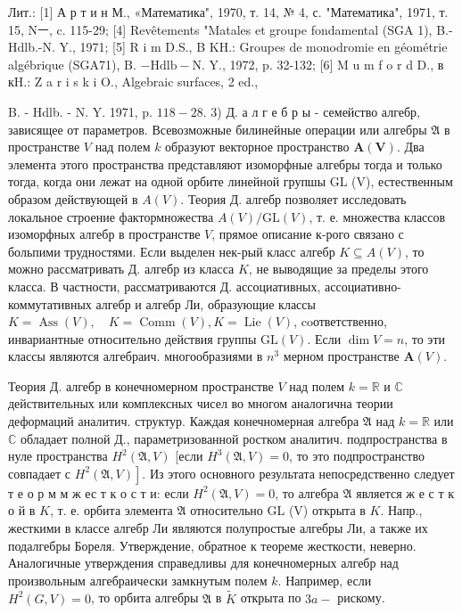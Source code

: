 \documentclass[10pt]{article}
\begin{document}
Лит.: [1] А р т и н М., «Математика", 1970, т. 14, № 4, с. "Математика", 1971, т. 15, Nㅡ, c. 115-29; [4] Revêtements "Matales et groupe fondamental (SGA 1), B.- Hdlb.-N. Y., 1971; [5] R i m D.S., B KH.: Groupes de monodromie en géométrie algébrique (SGA71), B. $-\mathrm{Hdlb}-\mathrm{N}$. Y., 1972, p. 32-132; [6] M u m f o r d D., в кH.: Z a r i s k i O., Algebraic surfaces, 2 ed.,

B. - Hdlb. - N. Y. 1971, p. $118-28$. 3) Д. а л г е б р ы - семейство алгебр, зависящее от параметров. Всевозможные билинейные операции или алгебры $\mathfrak{A}$ в пространстве $V$ над полем $k$ образуют векторное пространство $\boldsymbol{A}(\boldsymbol{V})$. Два элемента этого пространства представляют изоморфные алгебры тогда и только тогда, когда они лежат на одной орбите линейной групшы GL (V), естественным образом действующей в $A(V)$. Теория Д. алгебр позволяет исследовать локальное строение фактормножества $A(V) / \mathrm{GL}(V)$, т. е. множества классов изоморфных алгебр в пространстве $V$, прямое описание к-рого связано с больпими трудностями. Если выделен нек-рый класс алгебр $K \subseteq A(V)$, то можно рассматривать Д. алгебр из класса $K$, не выводящие за пределы этого класса. В частности, рассматриваются Д. ассоциативных, ассоциативно-коммутативных алгебр и алгебр Ли, образующие классы $K=\operatorname{Ass}(V), \quad K=\operatorname{Comm}(V), K=\operatorname{Lie}(V)$, coответственно, инвариантные относительно действия группы $\mathrm{GL}(V)$. Если $\operatorname{dim} V=n$, то эти классы являются алгебраич. многообразиями в $n^{3}$ мерном пространстве $\boldsymbol{A}(V)$.



Теория Д. алгебр в конечномерном пространстве $V$ над полем $k=\mathbb{R}$ и $\mathbb{C}$ действительных или комплексных чисел во многом аналогична теории деформаций аналитич. структур. Каждая конечномерная алгебра $\mathfrak{A}$ над $k=\mathbb{R}$ или $\mathbb{C}$ обладает полной Д., параметризованной ростком аналитич. подпространства в нуле пространства $H^{2}(\mathfrak{A}, V)$ [если $H^{3}(\mathfrak{A}, V)=0$, то это подпространство совпадает с $\left.H^{2}(\mathfrak{A}, V)\right]$. Из этого основного результата непосредственно следует т е о р м м ж ес т к о с т и: если $H^{2}(\mathfrak{A}, V)=0$, то алгебра $\mathfrak{A}$ является ж е с т к о й в $K$, т. е. орбита элемента $\mathfrak{A}$ относительно GL (V) открыта в $K$. Напр., жесткими в классе алгебр Ли являются полупростые алгебры Ли, а также их подалгебры Бореля. Утверждение, обратное к теореме жесткости, неверно. Аналогичные утверждения справедливы для конечномерных алгебр над произвольным алгебраически замкнутым полем $k$. Например, если $H^{2}(G, V)=0$, то орбита алгебры $\mathfrak{A}$ в $\tilde{K}$ открыта по $3 a-$ рискому.
\end{document}
